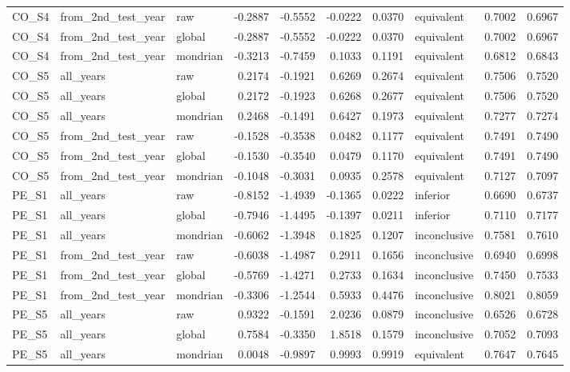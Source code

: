 \begin{tabular}{lllrrrrlrr}
CO\_S4 & from\_2nd\_test\_year & raw & -0.2887 & -0.5552 & -0.0222 & 0.0370 & equivalent & 0.7002 & 0.6967 \\
CO\_S4 & from\_2nd\_test\_year & global & -0.2887 & -0.5552 & -0.0222 & 0.0370 & equivalent & 0.7002 & 0.6967 \\
CO\_S4 & from\_2nd\_test\_year & mondrian & -0.3213 & -0.7459 & 0.1033 & 0.1191 & equivalent & 0.6812 & 0.6843 \\
CO\_S5 & all\_years & raw & 0.2174 & -0.1921 & 0.6269 & 0.2674 & equivalent & 0.7506 & 0.7520 \\
CO\_S5 & all\_years & global & 0.2172 & -0.1923 & 0.6268 & 0.2677 & equivalent & 0.7506 & 0.7520 \\
CO\_S5 & all\_years & mondrian & 0.2468 & -0.1491 & 0.6427 & 0.1973 & equivalent & 0.7277 & 0.7274 \\
CO\_S5 & from\_2nd\_test\_year & raw & -0.1528 & -0.3538 & 0.0482 & 0.1177 & equivalent & 0.7491 & 0.7490 \\
CO\_S5 & from\_2nd\_test\_year & global & -0.1530 & -0.3540 & 0.0479 & 0.1170 & equivalent & 0.7491 & 0.7490 \\
CO\_S5 & from\_2nd\_test\_year & mondrian & -0.1048 & -0.3031 & 0.0935 & 0.2578 & equivalent & 0.7127 & 0.7097 \\
PE\_S1 & all\_years & raw & -0.8152 & -1.4939 & -0.1365 & 0.0222 & inferior & 0.6690 & 0.6737 \\
PE\_S1 & all\_years & global & -0.7946 & -1.4495 & -0.1397 & 0.0211 & inferior & 0.7110 & 0.7177 \\
PE\_S1 & all\_years & mondrian & -0.6062 & -1.3948 & 0.1825 & 0.1207 & inconclusive & 0.7581 & 0.7610 \\
PE\_S1 & from\_2nd\_test\_year & raw & -0.6038 & -1.4987 & 0.2911 & 0.1656 & inconclusive & 0.6940 & 0.6998 \\
PE\_S1 & from\_2nd\_test\_year & global & -0.5769 & -1.4271 & 0.2733 & 0.1634 & inconclusive & 0.7450 & 0.7533 \\
PE\_S1 & from\_2nd\_test\_year & mondrian & -0.3306 & -1.2544 & 0.5933 & 0.4476 & inconclusive & 0.8021 & 0.8059 \\
PE\_S5 & all\_years & raw & 0.9322 & -0.1591 & 2.0236 & 0.0879 & inconclusive & 0.6526 & 0.6728 \\
PE\_S5 & all\_years & global & 0.7584 & -0.3350 & 1.8518 & 0.1579 & inconclusive & 0.7052 & 0.7093 \\
PE\_S5 & all\_years & mondrian & 0.0048 & -0.9897 & 0.9993 & 0.9919 & equivalent & 0.7647 & 0.7645 \\

\end{tabular}
